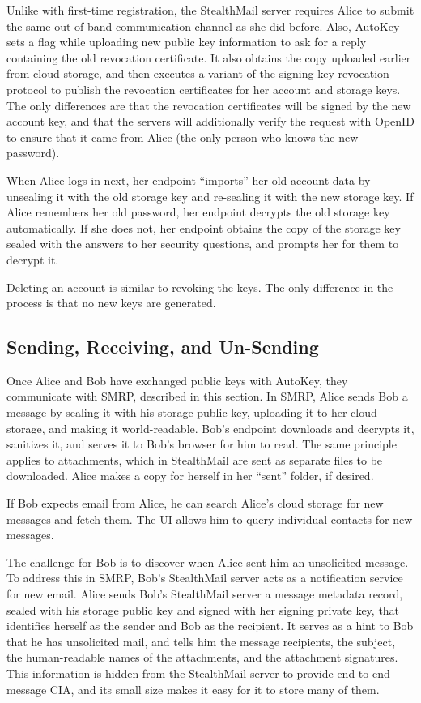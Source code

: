 Unlike with first-time registration, the StealthMail server requires Alice to submit the same out-of-band communication channel as she did before.  Also, AutoKey sets a flag while uploading new public key information to ask for a reply containing the old revocation certificate.  It also obtains the copy uploaded earlier from cloud storage, and then executes a variant of the signing key revocation protocol to publish the revocation certificates for her account and storage keys.  The only differences are that the revocation certificates will be signed by the new account key, and that the servers will additionally verify the request with OpenID to ensure that it came from Alice (the only person who knows the new password).

When Alice logs in next, her endpoint ``imports'' her old account data by unsealing it with the old storage key and re-sealing it with the new storage key.  If Alice remembers her old password, her endpoint decrypts the old storage key automatically.  If she does not, her endpoint obtains the copy of the storage key sealed with the answers to her security questions, and prompts her for them to decrypt it.

Deleting an account is similar to revoking the keys.  The only difference in the process is that no new keys are generated.

\subsection{Sending, Receiving, and Un-Sending}
Once Alice and Bob have exchanged public keys with AutoKey, they communicate with SMRP, described in this section.  In SMRP, Alice sends Bob a message by sealing it with his storage public key, uploading it to her cloud storage, and making it world-readable. Bob’s endpoint downloads and decrypts it, sanitizes it, and serves it to Bob’s browser for him to read. The same principle applies to attachments, which in StealthMail are sent as separate files to be downloaded.  Alice makes a copy for herself in her ``sent'' folder, if desired.

If Bob expects email from Alice, he can search Alice’s cloud storage for new messages and fetch them.  The UI allows him to query individual contacts for new messages.

The challenge for Bob is to discover when Alice sent him an unsolicited message.  To address this in SMRP, Bob’s StealthMail server acts as a notification service for new email.  Alice sends Bob's StealthMail server a message metadata record, sealed with his storage public key and signed with her signing private key, that identifies herself as the sender and Bob as the recipient.  It serves as a hint to Bob that he has unsolicited mail, and tells him the message recipients, the subject, the human-readable names of the attachments, and the attachment signatures.  This information is hidden from the StealthMail server to provide end-to-end message CIA, and its small size makes it easy for it to store many of them.


